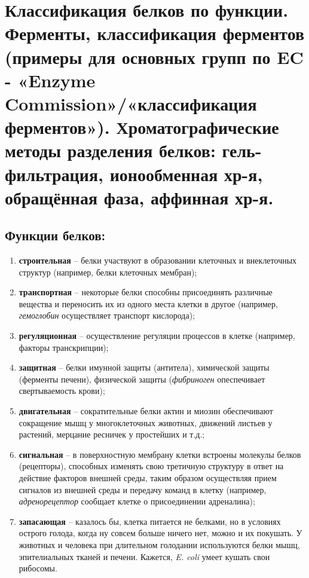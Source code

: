 \section{Классификация белков по функции. Ферменты, классификация ферментов (примеры для основных групп по EC - «Enzyme Commission»/«классификация ферментов»). Хроматографические методы разделения белков: гель-фильтрация, ионообменная хр-я, обращённая фаза, аффинная хр-я.}

\subsection{Функции белков:}

\begin{enumerate}
	\item \textbf{строительная} -- белки участвуют в образовании клеточных и внеклеточных структур (например, белки клеточных мембран);
	
	\item \textbf{транспортная} -- некоторые белки способны присоединять различные вещества и переносить их из одного места клетки в другое (например, \textit{гемоглобин} осуществляет транспорт кислорода);
	
	\item \textbf{регуляционная} -- осуществление регуляции процессов в клетке (например, факторы транскрипции);
	
	\item \textbf{защитная} -- белки имунной защиты (антитела), химической защиты (ферменты печени), физической защиты (\textit{фибриноген} опеспечивает свертываемость крови);
	
	\item \textbf{двигательная} -- сократительные белки актин и миозин обеспечивают сокращение мышц у многоклеточных животных, движений листьев у растений, мерцание ресничек у простейших и т.д.;
	
	\item \textbf{сигнальная} -- в поверхностную мембрану клетки встроены молекулы белков (рецепторы), способных изменять свою третичную структуру в ответ на действие факторов внешней среды, таким образом осуществляя прием сигналов из внешней среды и передачу команд в клетку (например, \textit{адренорецептор} сообщает клетке о присоединении адреналина);
	
	\item \textbf{запасающая} -- казалось бы, клетка питается не белками, но в условиях острого голода, когда ну совсем больше ничего нет, можно и их покушать. У животных и человека при длительном голодании используются белки мышц, эпителиальных тканей и печени. Кажется, \textit{E. coli} умеет кушать свои рибосомы.
	

\end{enumerate}

